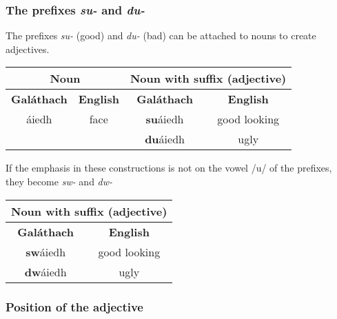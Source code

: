 \subsubsection{The prefixes \textit{su-} and \textit{du-}}

The prefixes \textit{su-} (good) and \textit{du-} (bad) can be attached to nouns to create adjectives.
\begin{table}[H]
\centering
\begin{tabular}{cccc}
  \toprule
  \multicolumn{2}{c}{\textbf{Noun}} & \multicolumn{2}{c}{\textbf{Noun with suffix (adjective)}}\\
  \midrule
  \textbf{Gal\'{a}thach} & \textbf{English} & \textbf{Gal\'{a}thach} & \textbf{English}\\
  \cmidrule(lr){1-1}\cmidrule(lr){2-2}\cmidrule(lr){3-3}\cmidrule(lr){4-4}
  \'{a}iedh & face & \textbf{su}\'{a}iedh & good looking\\
  & & \textbf{du}\'{a}iedh & ugly\\
  \bottomrule
\end{tabular}
\label{examples_suffix_su_du}
\end{table}

If the emphasis in these constructions is not on the vowel /u/ of the prefixes, they become \textit{sw-} and \textit{dw-}
\begin{table}[H]
\centering
\begin{tabular}{cc}
  \toprule
  \multicolumn{2}{c}{\textbf{Noun with suffix (adjective)}}\\
  \midrule
  \textbf{Gal\'{a}thach} & \textbf{English}\\
  \cmidrule(lr){1-1}\cmidrule(lr){2-2}
  \textbf{sw}\'{a}iedh & good looking\\
  \textbf{dw}\'{a}iedh & ugly\\
  \bottomrule
\end{tabular}
\label{examples_suffix_sw_dw}
\end{table}

\subsubsection{Position of the adjective}

